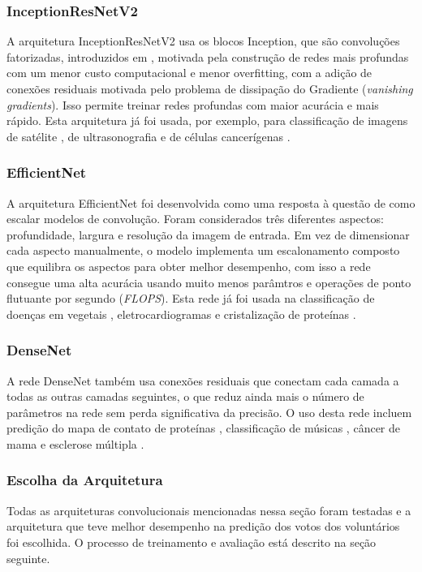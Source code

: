 \subsubsection{InceptionResNetV2}
\label{sec:inceptionresnetv2}
A arquitetura InceptionResNetV2 \cite{InceptionResNetv2} usa os blocos Inception, que são convoluções fatorizadas, introduzidos em \cite{Inception}, motivada pela construção de redes mais profundas com um menor custo computacional e menor overfitting, com a adição de conexões residuais \cite{ResNet} motivada pelo problema de dissipação do Gradiente (\textit{vanishing gradients}). Isso permite treinar redes profundas com maior acurácia e mais rápido. Esta arquitetura já foi usada, por exemplo, para classificação de imagens de satélite \cite{InceptionResNetV2Ex01}, de ultrasonografia \cite{InceptionResNetV2Ex02} e de células cancerígenas \cite{InceptionResNetV2Ex03}.

\subsubsection{EfficientNet}
\label{sec:efficientnet}
A arquitetura EfficientNet \cite{EfficientNet} foi desenvolvida como uma resposta à questão de como escalar modelos de convolução. Foram considerados três diferentes aspectos: profundidade, largura e resolução da imagem de entrada. Em vez de dimensionar cada aspecto manualmente, o modelo implementa um escalonamento composto que equilibra os aspectos para obter melhor desempenho, com isso a rede consegue uma alta acurácia usando muito menos parâmtros e operações de ponto flutuante por segundo (\emph{FLOPS}). Esta rede já foi usada na classificação de doenças em vegetais \cite{EfficientNetEx03}, eletrocardiogramas \cite{EfficientNetEx01} e cristalização de proteínas \cite{EfficientNetEx02}.

\subsubsection{DenseNet}
\label{sec:densenet}
A rede DenseNet \cite{DenseNet} também usa conexões residuais que conectam cada camada a todas as outras camadas seguintes, o que reduz ainda mais o número de parâmetros na rede sem perda significativa da precisão. O uso desta rede incluem predição do mapa de contato de proteínas \cite{DenseNetEx02}, classificação de músicas \cite{DenseNetEx05}, câncer de mama \cite{DenseNetEx01} e esclerose múltipla \cite{DenseNetEx03}.


\subsubsection{Escolha da Arquitetura}
\label{sec:escolha-arch}
Todas as arquiteturas convolucionais mencionadas nessa seção foram testadas e a arquitetura que teve melhor desempenho na predição dos votos dos voluntários foi escolhida. O processo de treinamento e avaliação está descrito na seção seguinte.



